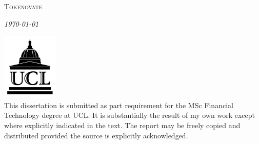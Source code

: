 \begin{titlepage}
\begin{minipage}{0.48\textwidth}
\begin{flushright}
                 \\
                 \\
                 \\
                 \\
                 \\
                 \\
                 \\
                \textsc{Tokenovate} \\ %
        \end{flushright}
    \end{minipage}
	\vfill\vfill\vfill %
	
	{\large\textit\today} %
	
       \includegraphics[width=0.2\textwidth]{ucl_logo}\\[1cm] %
	
	
	 This dissertation is submitted as part requirement for the MSc Financial Technology degree at UCL. It is substantially the result of my own work except where explicitly 	indicated in the text. The report may be freely copied and distributed provided the source is explicitly acknowledged.
	 

\end{titlepage}
